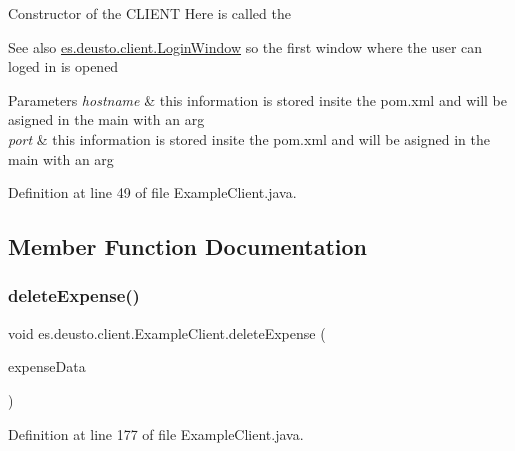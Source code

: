 Constructor of the C\+L\+I\+E\+NT Here is called the \begin{DoxySeeAlso}{See also}
\hyperlink{classes_1_1deusto_1_1client_1_1_login_window}{es.\+deusto.\+client.\+Login\+Window} so the first window where the user can loged in is opened 
\end{DoxySeeAlso}

\begin{DoxyParams}{Parameters}
{\em hostname} & this information is stored insite the pom.\+xml and will be asigned in the main with an arg \\
\hline
{\em port} & this information is stored insite the pom.\+xml and will be asigned in the main with an arg \\
\hline
\end{DoxyParams}


Definition at line 49 of file Example\+Client.\+java.



\subsection{Member Function Documentation}
\mbox{\label{classes_1_1deusto_1_1client_1_1_example_client_a206d3d1f399368f11a36b929af4337d4}} 
\subsubsection{\texorpdfstring{delete\+Expense()}{deleteExpense()}}
{\footnotesize\ttfamily void es.\+deusto.\+client.\+Example\+Client.\+delete\+Expense (\begin{DoxyParamCaption}\item[{\hyperlink{classes_1_1deusto_1_1serialization_1_1_expense_data}{Expense\+Data}}]{expense\+Data }\end{DoxyParamCaption})}



Definition at line 177 of file Example\+Client.\+java.

\mbox{\label{classes_1_1deusto_1_1client_1_1_example_client_a85a29c19dfbfcad9d08dcc17d688d8d3}} 
